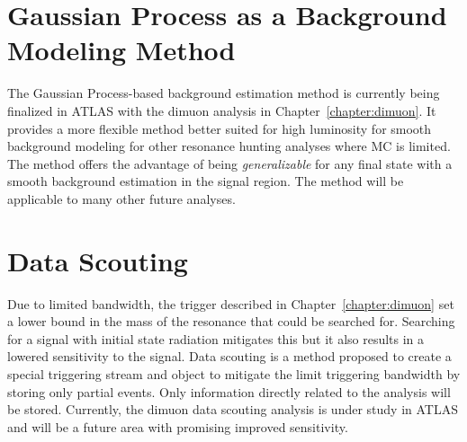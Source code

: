 \section{Gaussian Process as a Background Modeling Method}
The Gaussian Process-based background estimation method is currently being finalized in ATLAS with the dimuon analysis in Chapter~\ref{chapter:dimuon}. It provides a more flexible method better suited for high luminosity for smooth background modeling for other resonance hunting analyses where MC is limited. The method offers the advantage of being \textit{generalizable} for any final state with a smooth background estimation in the signal region. The method will be applicable to many other future analyses. 

\section{Data Scouting}
Due to limited bandwidth, the trigger described in Chapter~\ref{chapter:dimuon} set a lower bound in the mass of the resonance that could be searched for. Searching for a signal with initial state radiation mitigates this but it also results in a lowered sensitivity to the signal. Data scouting is a method proposed to create a special triggering stream and object to mitigate the limit triggering bandwidth by storing only partial events. Only information directly related to the analysis will be
stored. Currently, the dimuon data scouting analysis is under study in ATLAS and will be a future area with promising improved sensitivity. 

